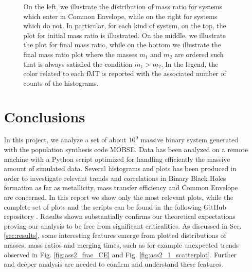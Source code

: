 \documentclass[prb,twocolumn,9pt]{revtex4-1}
\begin{document}
\begin{figure}[htp]
{    On the left, we illustrate the distribution of mass ratio for systems which enter in Common Envelope, while on the right for systems which do not. 
    In particular, for each kind of system, on the top, the plot for initial mass ratio is illustrated. On the middle, we illustrate the plot for final mass ratio, while on the bottom we illustrate the final mass ratio plot where the masses \(m_1\) and \(m_2\) are ordered such that is always satisfied the condition \(m_1>m_2\). In the legend, the color related to each fMT is reported  with the associated number of counts of the histograms.}
    \label{fig:ass2_1_q}
\end{figure}

\vspace{1cm}

\section{Conclusions}
In this project, we analyze a set of about \(10^9\) massive binary system generated  with  the  population  synthesis  code  MOBSE. Data has been analyzed on a remote machine with a Python script optimized for handling efficiently the massive amount of simulated data. Several histograms and plots has been produced in order to investigate relevant trends and correlations in Binary Black Holes formation as far as metallicity, mass transfer efficiency and Common Envelope are concerned.  In this report we show only the most relevant plots, while the complete set of plots and the scripts can be found in the following GitHub repository \cite{git}. 
Results shown substantially confirms our theoretical expectations proving our analysis to be free from significant criticalities. 
As discussed in Sec. \ref{sec:results}, some interesting features emerge from plotted distributions of masses, mass ratios and merging times, such as for example unexpected trends observed in Fig. \ref{fig:ass2_frac_CE} and Fig. \ref{fig:ass2_1_scatterplot}. 
Further and deeper analysis are needed to confirm and understand these features.
\end{document}
